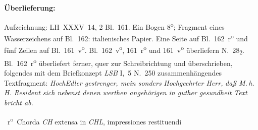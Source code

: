 %
%
%
%
%
\frenchspacing%
%
\begin{ledgroupsized}[r]{120mm}
\footnotesize
\pstart
\noindent\textbf{Überlieferung:}
\pend
\end{ledgroupsized}
\begin{ledgroupsized}[r]{114mm}
\footnotesize
\pstart \parindent -6mm
%
Aufzeichnung:
LH~XXXV~14, 2 Bl.~161.
Ein Bogen 8\textsuperscript{o};
Fragment eines Wasserzeichens auf Bl.~162:
italienisches Papier.
Eine Seite auf Bl.~162~r\textsuperscript{o}\! und fünf Zeilen auf Bl.~161~v\textsuperscript{o}.
Bl.~162~v\textsuperscript{o}, 161~r\textsuperscript{o} und 161~v\textsuperscript{o}\! überliefern N.~28\textsubscript{2}.
Bl.~162~r\textsuperscript{o} überliefert ferner, quer zur Schreib\-rich\-tung und überschrieben, folgendes mit dem Briefkonzept \textit{LSB} I,~5 N.~250\cite{01297} %
zusammenhängendes Textfragment:
%
\textit{HochEdler gestrenger, mein sonders} %
\textit{Hoch\-ge\-ehr\-ter Herr,} %
\textit{daß M.\,h.\,H. Resident sich nebenst denen} %
\textit{werthen angehörigen in guther gesundheit}%
\lbrack\textit{Text bricht ab.}\rbrack\
\pend
\end{ledgroupsized}
%
%
%
%
\frenchspacing%
%
\vspace{8mm}
%
%
\count{}
\count{}
\count{}
%
%
\pstart\noindent
\normalsize 
{}~r\textsuperscript{o}\rbrack\
Chorda\protect{} \textit{CH} extensa in \textit{CHL},
impressiones\protect{} restituendi
%
